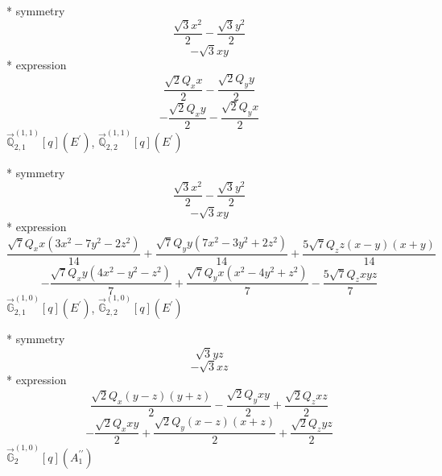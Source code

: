 \documentclass[fleqn,8pt]{jsarticle}
\begin{document}
\noindent\quad ** symmetry
\begin{dmath*}
\frac{\sqrt{3} x^{2}}{2} - \frac{\sqrt{3} y^{2}}{2}
\end{dmath*}
\begin{dmath*}
- \sqrt{3} x y
\end{dmath*}
\noindent\quad ** expression
\begin{dmath*}
\frac{\sqrt{2} Q_{x} x}{2} - \frac{\sqrt{2} Q_{y} y}{2}
\end{dmath*}
\begin{dmath*}
- \frac{\sqrt{2} Q_{x} y}{2} - \frac{\sqrt{2} Q_{y} x}{2}
\end{dmath*}
\noindent\quad $\vec{\mathbb{Q}}_{2,1}^{(1,1)}[q](E^{\prime})$, $\vec{\mathbb{Q}}_{2,2}^{(1,1)}[q](E^{\prime})$

\noindent\quad ** symmetry
\begin{dmath*}
\frac{\sqrt{3} x^{2}}{2} - \frac{\sqrt{3} y^{2}}{2}
\end{dmath*}
\begin{dmath*}
- \sqrt{3} x y
\end{dmath*}
\noindent\quad ** expression
\begin{dmath*}
\frac{\sqrt{7} Q_{x} x \left(3 x^{2} - 7 y^{2} - 2 z^{2}\right)}{14} + \frac{\sqrt{7} Q_{y} y \left(7 x^{2} - 3 y^{2} + 2 z^{2}\right)}{14} + \frac{5 \sqrt{7} Q_{z} z \left(x - y\right) \left(x + y\right)}{14}
\end{dmath*}
\begin{dmath*}
- \frac{\sqrt{7} Q_{x} y \left(4 x^{2} - y^{2} - z^{2}\right)}{7} + \frac{\sqrt{7} Q_{y} x \left(x^{2} - 4 y^{2} + z^{2}\right)}{7} - \frac{5 \sqrt{7} Q_{z} x y z}{7}
\end{dmath*}
\noindent\quad $\vec{\mathbb{G}}_{2,1}^{(1,0)}[q](E^{\prime})$, $\vec{\mathbb{G}}_{2,2}^{(1,0)}[q](E^{\prime})$

\noindent\quad ** symmetry
\begin{dmath*}
\sqrt{3} y z
\end{dmath*}
\begin{dmath*}
- \sqrt{3} x z
\end{dmath*}
\noindent\quad ** expression
\begin{dmath*}
\frac{\sqrt{2} Q_{x} \left(y - z\right) \left(y + z\right)}{2} - \frac{\sqrt{2} Q_{y} x y}{2} + \frac{\sqrt{2} Q_{z} x z}{2}
\end{dmath*}
\begin{dmath*}
- \frac{\sqrt{2} Q_{x} x y}{2} + \frac{\sqrt{2} Q_{y} \left(x - z\right) \left(x + z\right)}{2} + \frac{\sqrt{2} Q_{z} y z}{2}
\end{dmath*}
\noindent\quad $\vec{\mathbb{G}}_{2}^{(1,0)}[q](A_{1}^{\prime\prime})$
\end{document}

